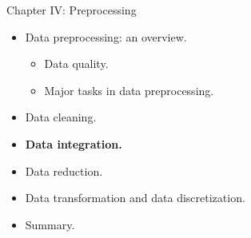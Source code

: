 \documentclass[aspectratio=169,t]{beamer}
\begin{document}
  { 
    \begin{frame}{Chapter IV: Preprocessing}
        \begin{itemize}
            \item Data preprocessing: an overview.
            \begin{itemize}
              \item Data quality.
              \item Major tasks in data preprocessing.
            \end{itemize}
            \item Data cleaning.
            \item \textbf{Data integration.}
            \item Data reduction.
            \item Data transformation and data discretization.
            \item Summary.
        \end{itemize}
    \end{frame}
  }
\end{document}
